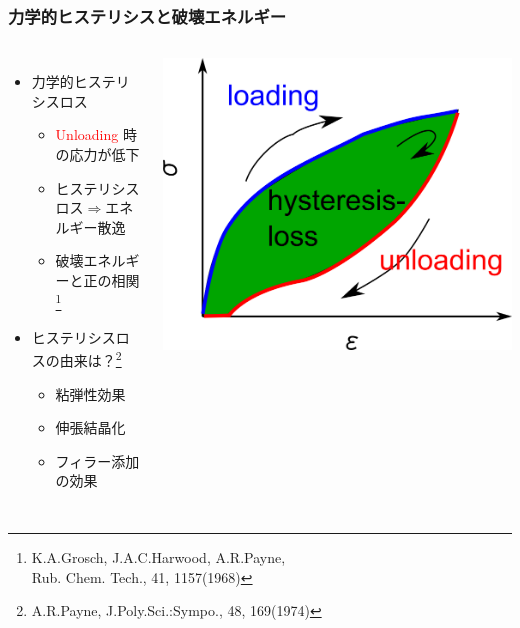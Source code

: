 \documentclass[unicode,12pt]{beamer}%
\begin{document}
\begin{frame}
	\frametitle{力学的ヒステリシスと破壊エネルギー}
	\vspace{-1mm}
			\begin{columns}[T, onlytextwidth]
					\begin{itemize}
						\item 力学的ヒステリシスロス
							\begin{itemize}
								\item \textcolor{red}{Unloading} 時の応力が低下
								\item ヒステリシスロス$\Rightarrow$エネルギー散逸
								\item \alert{破壊エネルギーと正の相関}\footnote{
									\scriptsize{K.A.Grosch, J.A.C.Harwood, A.R.Payne, \\Rub. Chem. Tech., 41, 1157(1968)}
								}
							\end{itemize}
						\item ヒステリシスロスの由来は？\footnote{
							\scriptsize{A.R.Payne, J.Poly.Sci.:Sympo., 48, 169(1974)}
						}
						\begin{itemize}
							\item \alert{粘弾性効果}
							\item 伸張結晶化
							\item フィラー添加の効果
						\end{itemize}
					\end{itemize}
				\begin{center}
					\vspace{-2mm}
					\includegraphics[width=\textwidth]{hysteresis_curve.png}


\end{center}
\end{columns}
\end{frame}
\end{document}
